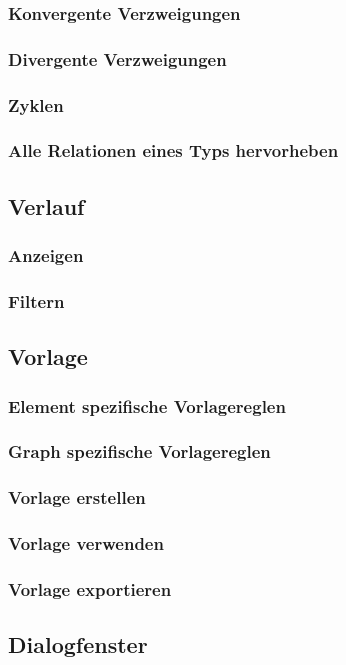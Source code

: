 \documentclass[enabledeprecatedfontcommands,fontsize=11pt,paper=a4,twoside]{scrartcl}
\newcounter{one}
\begin{document}
		\subsubsection{Konvergente Verzweigungen}
		\subsubsection{Divergente Verzweigungen}
		\subsubsection{Zyklen}
		\subsubsection{Alle Relationen eines Typs hervorheben}		
	\subsection{Verlauf} \label{logs}
		\subsubsection{Anzeigen}
		\subsubsection{Filtern}
	\subsection{Vorlage} \label{template}
		\subsubsection{Element spezifische Vorlagereglen}
		\subsubsection{Graph spezifische Vorlagereglen}
		\subsubsection{Vorlage erstellen}
		\subsubsection{Vorlage verwenden}
		\subsubsection{Vorlage exportieren}
	\subsection{Dialogfenster} \label{dialog}
	\newpage
\end{document}
